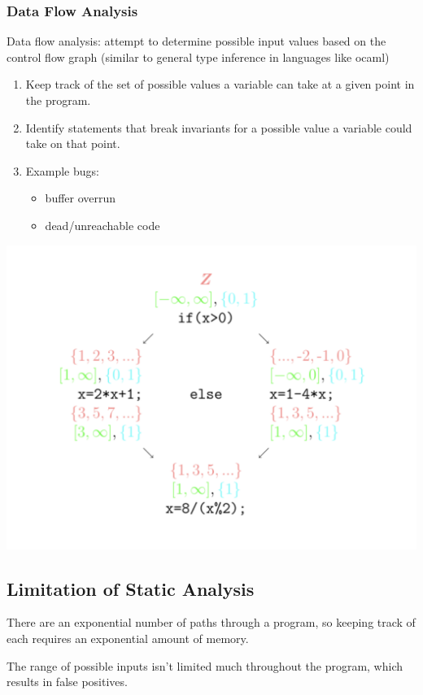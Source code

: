 \documentclass{article}
\begin{document}
\subsubsection{Data Flow Analysis}
Data flow analysis: attempt to determine possible input values based on the control flow graph (similar to general type inference in languages like ocaml)

\begin{enumerate}
    \item Keep track of the set of possible values a variable can take at a given point in the program. 
    \item Identify statements that break invariants for a possible value a variable could take on that point.
    \item Example bugs:
    \begin{itemize}
        \item buffer overrun 
        \item dead/unreachable code 
    \end{itemize}
\end{enumerate}

\includegraphics*[width=0.7\linewidth]{dataFlowAnalysis.png}

\subsection{Limitation of Static Analysis}

There are an exponential number of paths through a program, so keeping track of each requires an exponential amount of memory.

\vspace*{1em}

The range of possible inputs isn't limited much throughout the program, which results in false positives.

\vspace*{1em}
\end{document}
